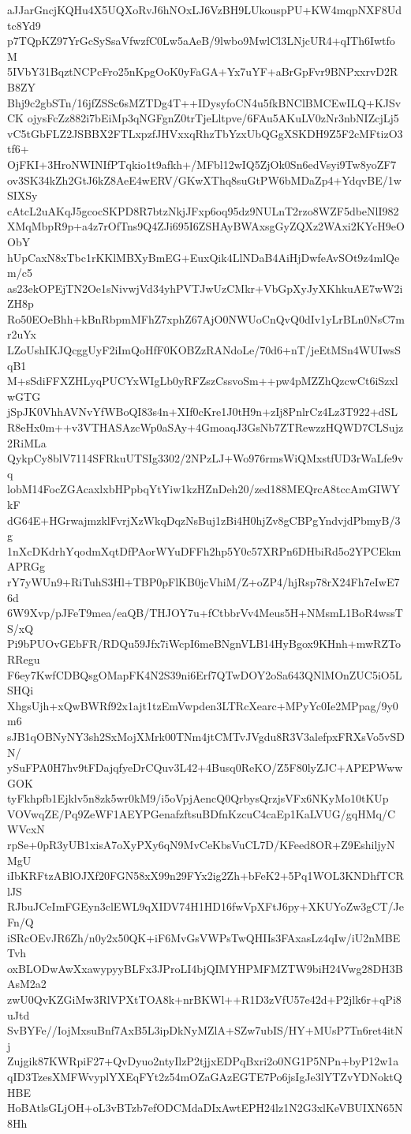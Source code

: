 aJJarGncjKQHu4X5UQXoRvJ6hNOxLJ6VzBH9LUkouspPU+KW4mqpNXF8Udtc8Yd9
p7TQpKZ97YrGcSySsaVfwzfC0Lw5aAeB/9lwbo9MwlCl3LNjcUR4+qITh6IwtfoM
5IVbY31BqztNCPcFro25nKpgOoK0yFaGA+Yx7uYF+aBrGpFvr9BNPxxrvD2RB8ZY
Bhj9c2gbSTn/16jfZSSc6sMZTDg4T++IDysyfoCN4u5fkBNClBMCEwILQ+KJSvCK
ojysFcZz882i7bEiMp3qNGFgnZ0trTjeLltpve/6FAu5AKuLV0zNr3nbNIZcjLj5
vC5tGbFLZ2JSBBX2FTLxpzfJHVxxqRhzTbYzxUbQGgXSKDH9Z5F2cMFtizO3tf6+
OjFKI+3HroNWINIfPTqkio1t9afkh+/MFbl12wIQ5ZjOk0Sn6edVsyi9Tw8yoZF7
ov3SK34kZh2GtJ6kZ8AeE4wERV/GKwXThq8suGtPW6bMDaZp4+YdqvBE/1wSIXSy
cAtcL2uAKqJ5gcocSKPD8R7btzNkjJFxp6oq95dz9NULnT2rzo8WZF5dbeNlI982
XMqMbpR9p+a4z7rOfTns9Q4ZJi695I6ZSHAyBWAxsgGyZQXz2WAxi2KYcH9eOObY
hUpCaxN8xTbc1rKKlMBXyBmEG+EuxQik4LlNDaB4AiHjDwfeAvSOt9z4mlQem/c5
as23ekOPEjTN2Oe1sNivwjVd34yhPVTJwUzCMkr+VbGpXyJyXKhkuAE7wW2iZH8p
Ro50EOeBhh+kBnRbpmMFhZ7xphZ67AjO0NWUoCnQvQ0dIv1yLrBLn0NsC7mr2uYx
LZoUshIKJQcggUyF2iImQoHfF0KOBZzRANdoLe/70d6+nT/jeEtMSn4WUIwsSqB1
M+sSdiFFXZHLyqPUCYxWIgLb0yRFZszCssvoSm++pw4pMZZhQzcwCt6iSzxlwGTG
jSpJK0VhhAVNvYfWBoQI83s4n+XIf0cKre1J0tH9n+zIj8PnlrCz4Lz3T922+dSL
R8eHx0m++v3VTHASAzcWp0aSAy+4GmoaqJ3GsNb7ZTRewzzHQWD7CLSujz2RiMLa
QykpCy8blV7114SFRkuUTSIg3302/2NPzLJ+Wo976rmsWiQMxstfUD3rWaLfe9vq
lobM14FocZGAcaxlxbHPpbqYtYiw1kzHZnDeh20/zed188MEQrcA8tccAmGIWYkF
dG64E+HGrwajmzklFvrjXzWkqDqzNsBuj1zBi4H0hjZv8gCBPgYndvjdPbmyB/3g
1nXcDKdrhYqodmXqtDfPAorWYuDFFh2hp5Y0c57XRPn6DHbiRd5o2YPCEkmAPRGg
rY7yWUn9+RiTuhS3Hl+TBP0pFlKB0jcVhiM/Z+oZP4/hjRsp78rX24Fh7eIwE76d
6W9Xvp/pJFeT9mea/eaQB/THJOY7u+fCtbbrVv4Meus5H+NMsmL1BoR4wssTS/xQ
Pi9bPUOvGEbFR/RDQu59Jfx7iWcpI6meBNgnVLB14HyBgox9KHnh+mwRZToRRegu
F6ey7KwfCDBQsgOMapFK4N2S39ni6Erf7QTwDOY2oSa643QNlMOnZUC5iO5LSHQi
XhgsUjh+xQwBWRf92x1ajt1tzEmVwpden3LTRcXearc+MPyYc0Ie2MPpag/9y0m6
sJB1qOBNyNY3sh2SxMojXMrk00TNm4jtCMTvJVgdu8R3V3alefpxFRXsVo5vSDN/
ySuFPA0H7hv9tFDajqfyeDrCQuv3L42+4Busq0ReKO/Z5F80lyZJC+APEPWwwGOK
tyFkhpfb1Ejklv5n8zk5wr0kM9/i5oVpjAencQ0QrbysQrzjsVFx6NKyMo10tKUp
VOVwqZE/Pq9ZeWF1AEYPGenafzftsuBDfnKzcuC4caEp1KaLVUG/gqHMq/CWVcxN
rpSe+0pR3yUB1xisA7oXyPXy6qN9MvCeKbsVuCL7D/KFeed8OR+Z9EshiljyNMgU
iIbKRFtzABlOJXf20FGN58xX99n29FYx2ig2Zh+bFeK2+5Pq1WOL3KNDhfTCRlJS
RJbuJCeImFGEyn3clEWL9qXIDV74H1HD16fwVpXFtJ6py+XKUYoZw3gCT/JeFn/Q
iSRcOEvJR6Zh/n0y2x50QK+iF6MvGsVWPsTwQHIIs3FAxasLz4qIw/iU2nMBETvh
oxBLODwAwXxawypyyBLFx3JProLI4bjQIMYHPMFMZTW9biH24Vwg28DH3BAsM2a2
zwU0QvKZGiMw3RlVPXtTOA8k+nrBKWl++R1D3zVfU57e42d+P2jlk6r+qPi8uJtd
SvBYFe//IojMxsuBnf7AxB5L3ipDkNyMZlA+SZw7ubIS/HY+MUsP7Tn6ret4itNj
Zujgik87KWRpiF27+QvDyuo2ntyIlzP2tjjxEDPqBxri2o0NG1P5NPn+byP12w1a
qID3TzesXMFWvyplYXEqFYt2z54mOZaGAzEGTE7Po6jsIgJe3lYTZvYDNoktQHBE
HoBAtlsGLjOH+oL3vBTzb7efODCMdaDIxAwtEPH24lz1N2G3xlKeVBUIXN65N8Hh
